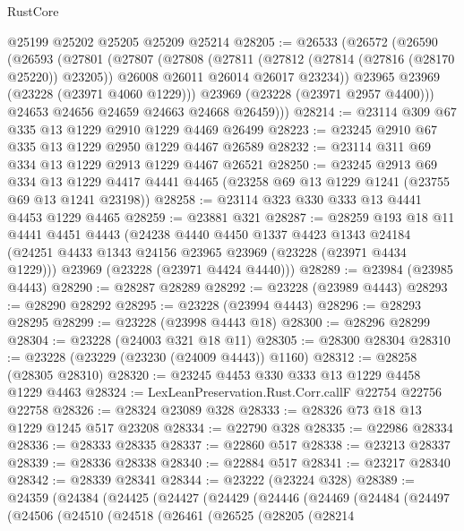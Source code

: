 \begin{lexlean}{RustCore}
\begin{coremodule}
    @25199
    @25202
    @25205
    @25209
    @25214
@28205 := @26533
    (@26572
      (@26590
        (@26593
          (@27801
            (@27807
              (@27808
                (@27811
                  (@27812 (@27814 (@27816 (@28170 @25220)) @23205))
                  @26008
                  @26011
                  @26014
                  @26017
                  @23234))
              @23965
              @23969
              (@23228 (@23971 @4060 @1229)))
            @23969
            (@23228 (@23971 @2957 @4400)))
          @24653
          @24656
          @24659
          @24663
          @24668
          @26459)))
@28214 := @23114 @309 @67 @335 @13 @1229 @2910 @1229 @4469 @26499
@28223 := @23245 @2910 @67 @335 @13 @1229 @2950 @1229 @4467 @26589
@28232 := @23114 @311 @69 @334 @13 @1229 @2913 @1229 @4467 @26521
@28250 := @23245
    @2913
    @69
    @334
    @13
    @1229
    @4417
    @4441
    @4465
    (@23258 @69 @13 @1229 @1241 (@23755 @69 @13 @1241 @23198))
@28258 := @23114 @323 @330 @333 @13 @4441 @4453 @1229 @4465
@28259 := @23881 @321
@28287 := @28259
    @193
    @18
    @11
    @4441
    @4451
    @4443
    (@24238
      @4440
      @4450
      @1337
      @4423
      @1343
      @24184
      (@24251 @4433 @1343 @24156 @23965 @23969 (@23228 (@23971 @4434 @1229)))
      @23969
      (@23228 (@23971 @4424 @4440)))
@28289 := @23984 (@23985 @4443)
@28290 := @28287 @28289
@28292 := @23228 (@23989 @4443)
@28293 := @28290 @28292
@28295 := @23228 (@23994 @4443)
@28296 := @28293 @28295
@28299 := @23228 (@23998 @4443 @18)
@28300 := @28296 @28299
@28304 := @23228 (@24003 @321 @18 @11)
@28305 := @28300 @28304
@28310 := @23228 (@23229 (@23230 (@24009 @4443)) @1160)
@28312 := @28258 (@28305 @28310)
@28320 := @23245 @4453 @330 @333 @13 @1229 @4458 @1229 @4463
@28324 := LexLeanPreservation.Rust.Corr.callF @22754 @22756 @22758
@28326 := @28324 @23089 @328
@28333 := @28326 @73 @18 @13 @1229 @1245 @517 @23208
@28334 := @22790 @328
@28335 := @22986 @28334
@28336 := @28333 @28335
@28337 := @22860 @517
@28338 := @23213 @28337
@28339 := @28336 @28338
@28340 := @22884 @517
@28341 := @23217 @28340
@28342 := @28339 @28341
@28344 := @23222 (@23224 @328)
@28389 := @24359
    (@24384
      (@24425
        (@24427
          (@24429
            (@24446
              (@24469
                (@24484
                  (@24497
                    (@24506
                      (@24510
                        (@24518
                          (@26461
                            (@26525
                              (@28205
                                (@28214

\end{coremodule}
\end{lexlean}
